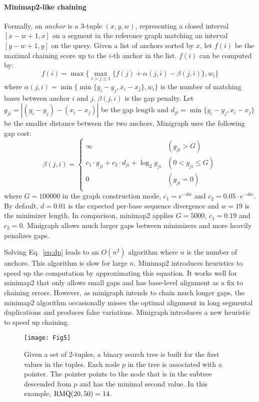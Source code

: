 \documentclass[twocolumn]{bmcart}
\begin{document}
\paragraph*{Minimap2-like chaining}
Formally, an \emph{anchor} is a 3-tuple $(x,y,w)$, representing a closed
interval $[x-w+1,x]$ on a segment in the reference graph matching an interval
$[y-w+1,y]$ on the query. Given a list of anchors sorted by $x$, let $f(i)$ be
the maximal chaining score up to the $i$-th anchor in the list. $f(i)$ can be
computed by:
\begin{equation}\label{eq:dp}
f(i)=\max\big\{\max_{i>j\ge1}\{f(j)+\alpha(j,i)-\beta(j,i)\},w_i\big\}
\end{equation}
where $\alpha(j,i)=\min\big\{\min\{y_i-y_j,x_i-x_j\},w_i\big\}$ is
the number of matching bases between anchor $i$ and $j$.
$\beta(j,i)$ is the gap penalty. Let $g_{ji}=|(y_i-y_j)-(x_i-x_j)|$
be the gap length and $d_{ji}=\min\{y_i-y_j,x_i-x_j\}$ be the smaller distance
between the two anchors.  Minigraph uses the following gap cost:
$$
\beta(j,i)=\left\{\begin{array}{ll}
\infty & (g_{ji}>G) \\
c_1\cdot g_{ji} + c_2\cdot d_{ji} + \log_2{g_{ji}} & (0<g_{ji}\le G) \\
0 & (g_{ji}=0)\\
\end{array}\right.
$$
where $G=100000$ in the graph construction mode, $c_1=e^{-dw}$ and
$c_2=0.05\cdot e^{-dw}$. By default, $d=0.01$ is the expected per-base sequence
divergence and $w=19$ is the minimizer length. In comparison, minimap2 applies
$G=5000$, $c_1=0.19$ and $c_2=0$. Minigraph allows much larger gaps between
minimizers and more heavily penalizes gaps.

Solving Eq.~\ref{eq:dp} leads to an $O(n^2)$ algorithm where $n$ is the number
of anchors. This algorithm is slow for large $n$. Minimap2 introduces
heuristics to speed up the computation by approximating this equation. It works
well for minimap2 that only allows small gaps and has base-level alignment as a
fix to chaining errors. However, as minigraph intends to chain much longer
gaps, the minimap2 algorithm occasionally misses the optimal alignment in long
segmental duplications and produces false variations. Minigraph introduces a
new heuristic to speed up chaining.

\begin{figure}[tb]
\centering
\texttt{[image: Fig5]}
\caption{ Given a
  set of 2-tuples, a binary search tree is built for the first values in the
  tuples. Each node $p$ in the tree is associated with a pointer. The pointer
  points to the node that is in the subtree descended from $p$ and has the
  minimal second value. In this example, ${\rm RMQ}(20,50)=14$.}\label{fig:rmq}
\end{figure}
\end{document}
